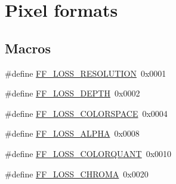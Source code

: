 \hypertarget{group__lavc__misc__pixfmt}{}\section{Pixel formats}
\label{group__lavc__misc__pixfmt}
\subsection*{Macros}
\begin{DoxyCompactItemize}
\item 
\#define \hyperlink{group__lavc__misc__pixfmt_ga445e6541dde2408332c216b8d0accb2d}{F\+F\+\_\+\+L\+O\+S\+S\+\_\+\+R\+E\+S\+O\+L\+U\+T\+I\+ON}~0x0001
\item 
\#define \hyperlink{group__lavc__misc__pixfmt_ga979c0713dde53e85a56a83c8094f30a9}{F\+F\+\_\+\+L\+O\+S\+S\+\_\+\+D\+E\+P\+TH}~0x0002
\item 
\#define \hyperlink{group__lavc__misc__pixfmt_ga4701dd352b2a194eaed493399ccdca47}{F\+F\+\_\+\+L\+O\+S\+S\+\_\+\+C\+O\+L\+O\+R\+S\+P\+A\+CE}~0x0004
\item 
\#define \hyperlink{group__lavc__misc__pixfmt_ga5e5683a0c698af4701cc768f2944b6f4}{F\+F\+\_\+\+L\+O\+S\+S\+\_\+\+A\+L\+P\+HA}~0x0008
\item 
\#define \hyperlink{group__lavc__misc__pixfmt_gae4dedba75cbb41704ce6794f966f10a6}{F\+F\+\_\+\+L\+O\+S\+S\+\_\+\+C\+O\+L\+O\+R\+Q\+U\+A\+NT}~0x0010
\item 
\#define \hyperlink{group__lavc__misc__pixfmt_ga769162ddb5b87080ab7a39291837f832}{F\+F\+\_\+\+L\+O\+S\+S\+\_\+\+C\+H\+R\+O\+MA}~0x0020
\end{DoxyCompactItemize}
